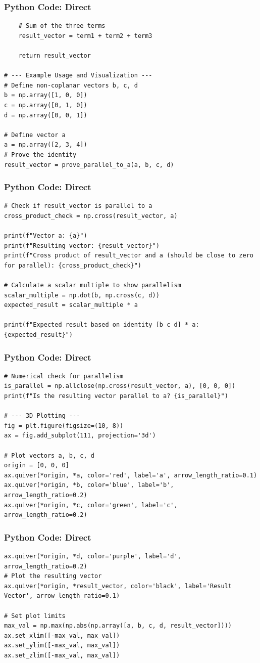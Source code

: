 \documentclass{beamer}
\begin{document}
\begin{frame}[fragile]
\frametitle{Python Code: Direct}
\begin{lstlisting}
    # Sum of the three terms
    result_vector = term1 + term2 + term3

    return result_vector

# --- Example Usage and Visualization ---
# Define non-coplanar vectors b, c, d
b = np.array([1, 0, 0])
c = np.array([0, 1, 0])
d = np.array([0, 0, 1])

# Define vector a
a = np.array([2, 3, 4])
# Prove the identity
result_vector = prove_parallel_to_a(a, b, c, d)
\end{lstlisting}
\end{frame}

\begin{frame}[fragile]
\frametitle{Python Code: Direct}
\begin{lstlisting}
# Check if result_vector is parallel to a
cross_product_check = np.cross(result_vector, a)

print(f"Vector a: {a}")
print(f"Resulting vector: {result_vector}")
print(f"Cross product of result_vector and a (should be close to zero for parallel): {cross_product_check}")

# Calculate a scalar multiple to show parallelism
scalar_multiple = np.dot(b, np.cross(c, d))
expected_result = scalar_multiple * a

print(f"Expected result based on identity [b c d] * a: {expected_result}")
\end{lstlisting}
\end{frame}

\begin{frame}[fragile]
\frametitle{Python Code: Direct}
\begin{lstlisting}
# Numerical check for parallelism
is_parallel = np.allclose(np.cross(result_vector, a), [0, 0, 0])
print(f"Is the resulting vector parallel to a? {is_parallel}")

# --- 3D Plotting ---
fig = plt.figure(figsize=(10, 8))
ax = fig.add_subplot(111, projection='3d')

# Plot vectors a, b, c, d
origin = [0, 0, 0]
ax.quiver(*origin, *a, color='red', label='a', arrow_length_ratio=0.1)
ax.quiver(*origin, *b, color='blue', label='b', arrow_length_ratio=0.2)
ax.quiver(*origin, *c, color='green', label='c', arrow_length_ratio=0.2)
\end{lstlisting}
\end{frame}

\begin{frame}[fragile]
\frametitle{Python Code: Direct}
\begin{lstlisting}
ax.quiver(*origin, *d, color='purple', label='d', arrow_length_ratio=0.2)
# Plot the resulting vector
ax.quiver(*origin, *result_vector, color='black', label='Result Vector', arrow_length_ratio=0.1)

# Set plot limits
max_val = np.max(np.abs(np.array([a, b, c, d, result_vector])))
ax.set_xlim([-max_val, max_val])
ax.set_ylim([-max_val, max_val])
ax.set_zlim([-max_val, max_val])
\end{lstlisting}
\end{frame}
\end{document}
